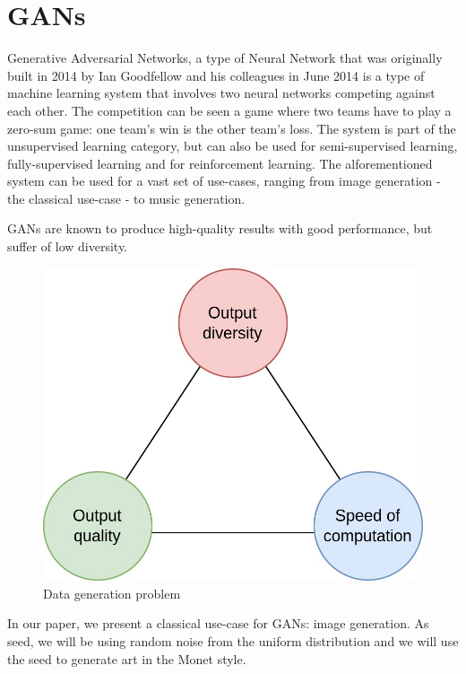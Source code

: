 \documentclass[conference]{IEEEtran}
\begin{document}
\section{GANs}
Generative Adversarial Networks, a type of Neural Network that was originally built in 2014 by Ian Goodfellow and his
colleagues in June 2014 \cite{b1} is a type of machine learning system that involves two neural networks competing against
each other. The competition can be seen a game where two teams have to play a zero-sum game: one team's win is the other
team's loss. The system is part of the unsupervised learning category, but can also be used for semi-supervised learning,
fully-supervised learning and for reinforcement learning. The alforementioned system can be used for a vast set of use-cases,
ranging from image generation - the classical use-case - to music generation.

GANs are known to produce high-quality results with good performance, but suffer of low diversity.

\begin{figure}[!h]
    \centering
    \includegraphics[scale=0.15]{images/generator problem.jpg}
    \caption{Data generation problem} \label{Data generation problem}
\end{figure}

In our paper, we present a classical use-case for GANs: image generation. As seed, we will be using random noise from
the uniform distribution and we will use the seed to generate art in the Monet style.
\end{document}

